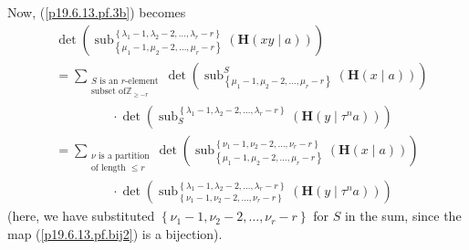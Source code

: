 \documentclass[numbers=enddot,12pt,final,onecolumn,notitlepage]{scrartcl}%
\theoremstyle{definition}
\let\sumnonlimits\sum
\renewcommand{\sum}{\sumnonlimits\limits}
\begin{document}
\begin{enumerate}
Now, (\ref{p19.6.13.pf.3b}) becomes
\begin{align}
&  \det\left(  \operatorname*{sub}\nolimits_{\left\{  \mu_{1}-1,\mu
_{2}-2,\ldots,\mu_{r}-r\right\}  }^{\left\{  \lambda_{1}-1,\lambda
_{2}-2,\ldots,\lambda_{r}-r\right\}  }\left(  \mathbf{H}\left(  xy\mid
a\right)  \right)  \right) \nonumber\\
&  =\sum_{\substack{S\text{ is an }r\text{-element}\\\text{subset of
}\mathbb{Z}_{\geq-r}}}\det\left(  \operatorname*{sub}\nolimits_{\left\{
\mu_{1}-1,\mu_{2}-2,\ldots,\mu_{r}-r\right\}  }^{S}\left(  \mathbf{H}\left(
x\mid a\right)  \right)  \right) \nonumber\\
&  \ \ \ \ \ \ \ \ \ \ \ \ \ \ \ \ \ \ \ \ \cdot\det\left(
\operatorname*{sub}\nolimits_{S}^{\left\{  \lambda_{1}-1,\lambda_{2}%
-2,\ldots,\lambda_{r}-r\right\}  }\left(  \mathbf{H}\left(  y\mid\tau
^{n}a\right)  \right)  \right) \nonumber\\
&  =\sum_{\substack{\nu\text{ is a partition}\\\text{of length }\leq r}%
}\det\left(  \operatorname*{sub}\nolimits_{\left\{  \mu_{1}-1,\mu_{2}%
-2,\ldots,\mu_{r}-r\right\}  }^{\left\{  \nu_{1}-1,\nu_{2}-2,\ldots,\nu
_{r}-r\right\}  }\left(  \mathbf{H}\left(  x\mid a\right)  \right)  \right)
\nonumber\\
&  \ \ \ \ \ \ \ \ \ \ \ \ \ \ \ \ \ \ \ \ \cdot\det\left(
\operatorname*{sub}\nolimits_{\left\{  \nu_{1}-1,\nu_{2}-2,\ldots,\nu
_{r}-r\right\}  }^{\left\{  \lambda_{1}-1,\lambda_{2}-2,\ldots,\lambda
_{r}-r\right\}  }\left(  \mathbf{H}\left(  y\mid\tau^{n}a\right)  \right)
\right)  \ \ \ \ \ \ \ \ \ \ \ \ \ \label{p19.6.13.pf.4}%
\end{align}
(here, we have substituted $\left\{  \nu_{1}-1,\nu_{2}-2,\ldots,\nu
_{r}-r\right\}  $ for $S$ in the sum, since the map (\ref{p19.6.13.pf.bij2})
is a bijection).


\end{enumerate}
\end{document}

